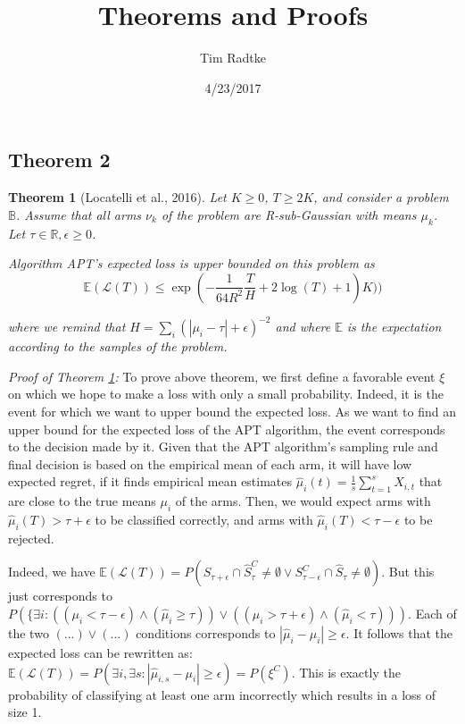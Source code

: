 \documentclass[12pt,]{article}
\title{Theorems and Proofs}
\author{Tim Radtke}
\date{4/23/2017}
\newtheorem{theorem}{Theorem}
\begin{document}
\maketitle

\subsection{Theorem 2}\label{theorem-2}

\begin{theorem}[Locatelli et al., 2016] \label{theorem:LocatelliTheorem4}
Let $K \geq 0$, $T \geq 2K$, and consider a problem $\mathbb{B}$. Assume that
all arms $\nu_k$ of the problem are R-sub-Gaussian with means $\mu_k$. Let $\tau
\in \mathbb{R}, \epsilon \geq 0$.

Algorithm APT's expected loss is upper bounded on this problem as 
\begin{equation*} \mathbb{E}(\mathcal{L}(T)) \leq \exp
(-\frac{1}{64R^2}\frac{T}{H} + 2 \log (T) + 1)K)) \end{equation*}

where we remind that $H = \sum_i (|\mu_i - \tau | + \epsilon)^{-2}$ and where
$\mathbb{E}$ is the expectation according to the samples of the problem.
\end{theorem}

\emph{Proof of Theorem \ref{theorem:LocatelliTheorem4}:} To prove above
theorem, we first define a favorable event \(\xi\) on which we hope to
make a loss with only a small probability. Indeed, it is the event for
which we want to upper bound the expected loss. As we want to find an
upper bound for the expected loss of the APT algorithm, the event
corresponds to the decision made by it. Given that the APT algorithm's
sampling rule and final decision is based on the empirical mean of each
arm, it will have low expected regret, if it finds empirical mean
estimates \(\hat{\mu}_i(t) = \frac{1}{s} \sum_{t=1}^s X_{i,t}\) that are
close to the true means \(\mu_i\) of the arms. Then, we would expect
arms with \(\hat{\mu}_i(T) > \tau + \epsilon\) to be classified
correctly, and arms with \(\hat{\mu}_i(T) < \tau - \epsilon\) to be
rejected.

Indeed, we have
\(\mathbb{E}(\mathcal{L}(T)) = P(S_{\tau + \epsilon} \cap \hat{S}_\tau^C \neq \emptyset \lor S_{\tau-\epsilon}^C \cap \hat{S}_{\tau} \neq \emptyset)\).
But this just corresponds to
\(P(\{\exists i: ((\mu_i < \tau-\epsilon) \land(\hat{\mu}_i \geq \tau)) \lor ((\mu_i > \tau + \epsilon) \land (\hat{\mu}_i < \tau)))\).
Each of the two \((...)\lor(...)\) conditions corresponds to
\(| \hat{\mu}_i - \mu_i | \geq \epsilon\). It follows that the expected
loss can be rewritten as:
\(\mathbb{E}(\mathcal{L}(T)) = P(\exists i, \exists s: |\hat{\mu}_{i,s} - \mu_i | \geq \epsilon) = P(\xi^C)\).
This is exactly the probability of classifying at least one arm
incorrectly which results in a loss of size 1.
\end{document}
